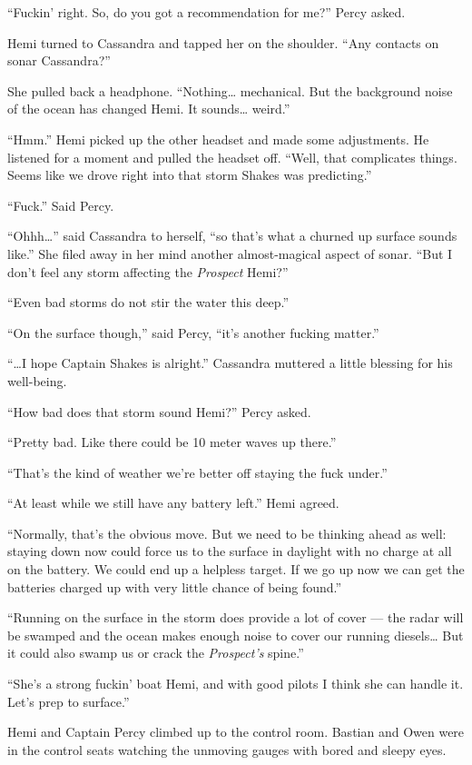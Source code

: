 \documentclass[]{scrbook}
\begin{document}
``Fuckin' right. So, do you got a recommendation for me?'' Percy asked.

Hemi turned to Cassandra and tapped her on the shoulder. ``Any contacts
on sonar Cassandra?''

She pulled back a headphone. ``Nothing\ldots{} mechanical. But the
background noise of the ocean has changed Hemi. It sounds\ldots{}
weird.''

``Hmm.'' Hemi picked up the other headset and made some adjustments. He
listened for a moment and pulled the headset off. ``Well, that
complicates things. Seems like we drove right into that storm Shakes was
predicting.''

``Fuck.'' Said Percy.

``Ohhh\ldots{}'' said Cassandra to herself, ``so that's what a churned
up surface sounds like.'' She filed away in her mind another
almost-magical aspect of sonar. ``But I don't feel any storm affecting
the \emph{Prospect} Hemi?''

``Even bad storms do not stir the water this deep.''

``On the surface though,'' said Percy, ``it's another fucking matter.''

``\ldots{}I hope Captain Shakes is alright.'' Cassandra muttered a
little blessing for his well-being.

``How bad does that storm sound Hemi?'' Percy asked.

``Pretty bad. Like there could be 10 meter waves up there.''

``That's the kind of weather we're better off staying the fuck under.''

``At least while we still have any battery left.'' Hemi agreed.

``Normally, that's the obvious move. But we need to be thinking ahead as
well: staying down now could force us to the surface in daylight with no
charge at all on the battery. We could end up a helpless target. If we
go up now we can get the batteries charged up with very little chance of
being found.''

``Running on the surface in the storm does provide a lot of cover ---
the radar will be swamped and the ocean makes enough noise to cover our
running diesels\ldots{} But it could also swamp us or crack the
\emph{Prospect's} spine.''

``She's a strong fuckin' boat Hemi, and with good pilots I think she can
handle it. Let's prep to surface.''

Hemi and Captain Percy climbed up to the control room. Bastian and Owen
were in the control seats watching the unmoving gauges with bored and
sleepy eyes.
\end{document}
